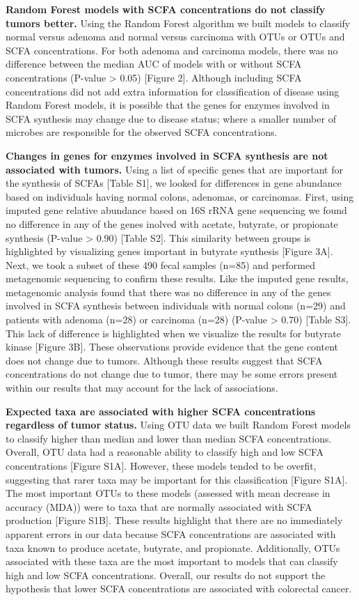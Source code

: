 \documentclass[11pt,]{article}
\begin{document}
\textbf{Random Forest models with SCFA concentrations do not classify
tumors better.} Using the Random Forest algorithm we built models to
classify normal versus adenoma and normal versus carcinoma with OTUs or
OTUs and SCFA concentrations. For both adenoma and carcinoma models,
there was no difference between the median AUC of models with or without
SCFA concentrations (P-value \textgreater{} 0.05) {[}Figure 2{]}.
Although including SCFA concentrations did not add extra information for
classification of disease using Random Forest models, it is possible
that the genes for enzymes involved in SCFA synthesis may change due to
disease status; where a smaller number of microbes are responsible for
the observed SCFA concentrations.

\textbf{Changes in genes for enzymes involved in SCFA synthesis are not
associated with tumors.} Using a list of specific genes that are
important for the synthesis of SCFAs {[}Table S1{]}, we looked for
differences in gene abundance based on individuals having normal colons,
adenomas, or carcinomas. First, using imputed gene relative abundance
based on 16S rRNA gene sequencing we found no difference in any of the
genes inolved with acetate, butyrate, or propionate synthesis (P-value
\textgreater{} 0.90) {[}Table S2{]}. This similarity between groups is
highlighted by visualizing genes important in butyrate synthesis
{[}Figure 3A{]}. Next, we took a subset of these 490 fecal samples
(n=85) and performed metagenomic sequencing to confirm these results.
Like the imputed gene results, metagenomic analysis found that there was
no difference in any of the genes involved in SCFA synthesis between
individuals with normal colons (n=29) and patients with adenoma (n=28)
or carcinoma (n=28) (P-value \textgreater{} 0.70) {[}Table S3{]}. This
lack of difference is highlighted when we visualize the results for
butyrate kinase {[}Figure 3B{]}. These observations provide evidence
that the gene content does not change due to tumors. Although these
results suggest that SCFA concentrations do not change due to tumor,
there may be some errors present within our results that may account for
the lack of associations.

\textbf{Expected taxa are associated with higher SCFA concentrations
regardless of tumor status.} Using OTU data we built Random Forest
models to classify higher than median and lower than median SCFA
concentrations. Overall, OTU data had a reasonable ability to classify
high and low SCFA concentrations {[}Figure S1A{]}. However, these models
tended to be overfit, suggesting that rarer taxa may be important for
this classification {[}Figure S1A{]}. The most important OTUs to these
models (assessed with mean decrease in accuracy (MDA)) were to taxa that
are normally associated with SCFA production {[}Figure S1B{]}. These
results highlight that there are no immediately apparent errors in our
data because SCFA concentrations are associated with taxa known to
produce acetate, butyrate, and propionate. Additionally, OTUs associated
with these taxa are the most important to models that can classify high
and low SCFA concentrations. Overall, our results do not support the
hypothesis that lower SCFA concentrations are associated with colorectal
cancer.
\end{document}
